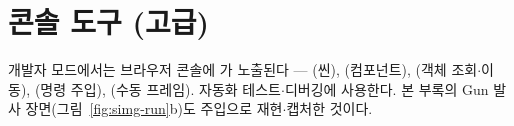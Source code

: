 \section{콘솔 도구 (고급)}
개발자 모드에서는 브라우저 콘솔에 가 노출된다 ---
(씬), (컴포넌트), 
(객체 조회$\cdot$이동), (명령 주입), (수동 프레임).
자동화 테스트$\cdot$디버깅에 사용한다. 본 부록의 Gun 발사 장면(그림~\ref{fig:simg-run}b)도
 주입으로 재현$\cdot$캡처한 것이다.
